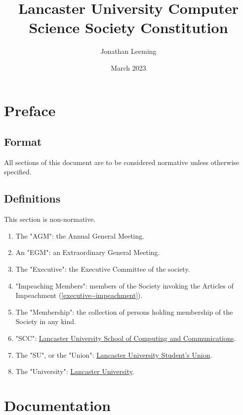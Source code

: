\documentclass{scrartcl}
\title{Lancaster University Computer Science Society Constitution}
\author{Jonathan Leeming}
\date{March 2023}
\begin{document}
    \maketitle

    \clearpage
    \tableofcontents

    \clearpage
    \section{Preface}
        \label{preface}
        \subsection{Format}
            \label{preface--format}
            All sections of this document are to be considered normative unless otherwise specified.

        \subsection{Definitions}
            \label{preface--definition}
            This section is non-normative.

            \begin{enumerate}
                \item The "AGM": the Annual General Meeting.
                \item An "EGM": an Extraordinary General Meeting.
                \item The "Executive": the Executive Committee of the society.
                \item "Impeaching Members": members of the Society invoking the Articles of Impeachment (\ref{executive--impeachment}).
                \item The "Membership": the collection of persons holding membership of the Society in any kind.
                \item "SCC": \href{https://www.lancaster.ac.uk/scc}{Lancaster University School of Computing and Communications}.
                \item The "SU", or the "Union": \href{https://www.lancastersu.co.uk}{Lancaster University Student's Union}.
                \item The "University": \href{https://www.lancaster.ac.uk}{Lancaster University}.
            \end{enumerate}

    \clearpage
    \section{Documentation}
        \label{documentation}
\end{document}
